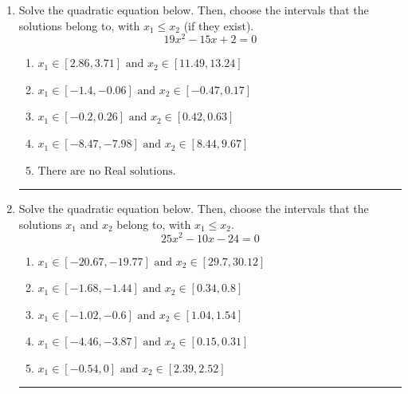 \documentclass[14pt]{extbook}
\newcommand{\litem}[1]{\item#1\hspace*{-1cm}\rule{\textwidth}{0.4pt}}
\begin{document}
\begin{enumerate}
\litem{
Solve the quadratic equation below. Then, choose the intervals that the solutions belong to, with $x_1 \leq x_2$ (if they exist).\[ 19x^{2} -15 x + 2 = 0 \]\begin{enumerate}[label=\Alph*.]
\item \( x_1 \in [2.86, 3.71] \text{ and } x_2 \in [11.49, 13.24] \)
\item \( x_1 \in [-1.4, -0.06] \text{ and } x_2 \in [-0.47, 0.17] \)
\item \( x_1 \in [-0.2, 0.26] \text{ and } x_2 \in [0.42, 0.63] \)
\item \( x_1 \in [-8.47, -7.98] \text{ and } x_2 \in [8.44, 9.67] \)
\item \( \text{There are no Real solutions.} \)

\end{enumerate} }
\litem{
Solve the quadratic equation below. Then, choose the intervals that the solutions $x_1$ and $x_2$ belong to, with $x_1 \leq x_2$.\[ 25x^{2} -10 x -24 = 0 \]\begin{enumerate}[label=\Alph*.]
\item \( x_1 \in [-20.67, -19.77] \text{ and } x_2 \in [29.7, 30.12] \)
\item \( x_1 \in [-1.68, -1.44] \text{ and } x_2 \in [0.34, 0.8] \)
\item \( x_1 \in [-1.02, -0.6] \text{ and } x_2 \in [1.04, 1.54] \)
\item \( x_1 \in [-4.46, -3.87] \text{ and } x_2 \in [0.15, 0.31] \)
\item \( x_1 \in [-0.54, 0] \text{ and } x_2 \in [2.39, 2.52] \)


\end{enumerate}}
\end{enumerate}
\end{document}
